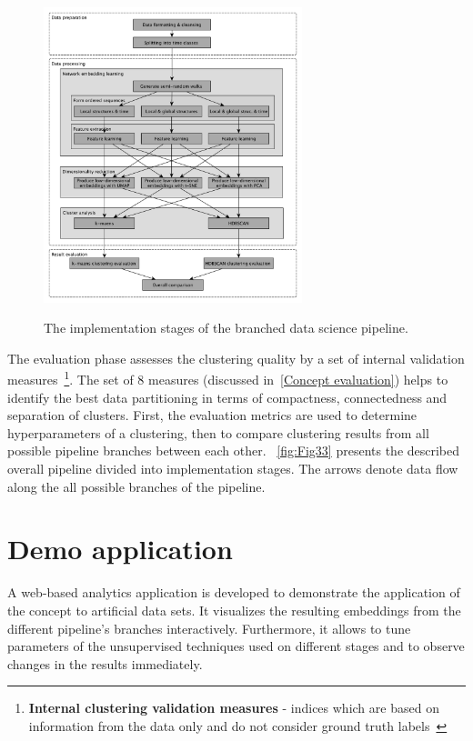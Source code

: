 \begin{figure}[!ht]
	\centering
	\includegraphics[width=0.67\textwidth]{images/Fig33.pdf}\\
	\caption{The implementation stages of the branched data science pipeline.}
	\label{fig:Fig33}
\end{figure}

The evaluation phase assesses the clustering quality by a set of internal validation measures~\footnote{\textbf{Internal clustering validation measures} - indices which are based on information from the data only and do not consider ground truth labels~\cite{hamalainen2017comparison}}. The set of 8 measures (discussed in~\ref{Concept evaluation}) helps to identify the best data partitioning in terms of compactness, connectedness and separation of clusters. First, the evaluation metrics are used to determine hyperparameters of a clustering, then to compare clustering results from all possible pipeline branches between each other. ~\autoref{fig:Fig33} presents the described overall pipeline divided into implementation stages. The arrows denote data flow along the all possible branches of the pipeline.

\section{Demo application}
\label{Demo application}
A web-based analytics application is developed to demonstrate the application of the concept to artificial data sets. It visualizes the resulting embeddings from the different pipeline's branches interactively. Furthermore, it allows to tune parameters of the unsupervised techniques used on different stages and to observe changes in the results immediately. 

